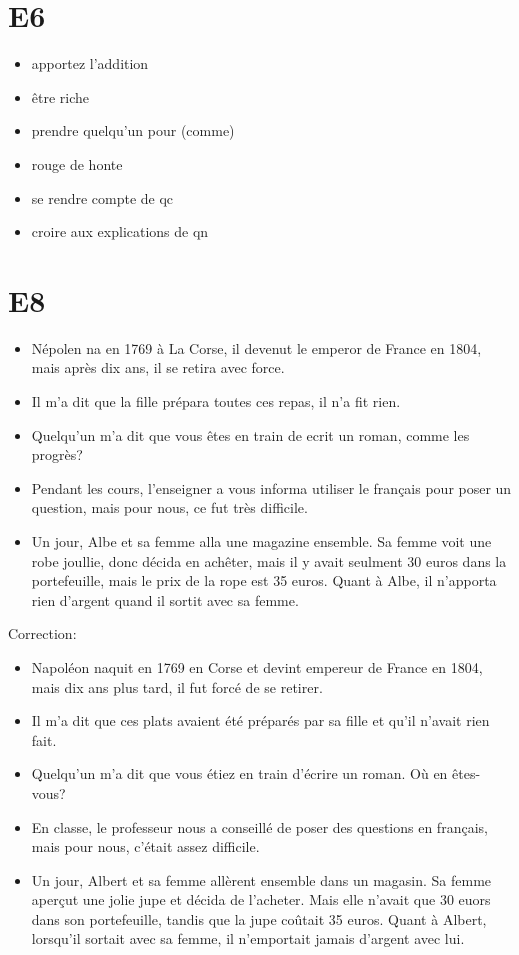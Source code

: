 \documentclass{book}
\begin{document}
    \section{E6}
        \begin{itemize}
            \item apportez l'addition
            \item être riche
            \item prendre quelqu'un pour (comme)
            \item rouge de honte
            \item se rendre compte de qc
            \item croire aux explications de qn
        \end{itemize}

    \section{E8}
        \begin{itemize}
            \item Népolen na en 1769 à La Corse, il devenut le emperor de France en 1804, 
                    mais après dix ans, il se retira avec force.
            \item Il m'a dit que la fille prépara toutes ces repas, il n'a fit rien.
            \item Quelqu'un m'a dit que vous êtes en train de ecrit un roman, comme les progrès?
            \item Pendant les cours, l'enseigner a vous informa utiliser le français pour poser un question, 
                    mais pour nous, ce fut très difficile.
            \item Un jour, Albe et sa femme alla une magazine ensemble. Sa femme voit une robe joullie,
                    donc décida en achêter, mais il y avait seulment 30 euros dans la portefeuille, mais le prix de la rope est 35 euros.
                    Quant à Albe, il n'apporta rien d'argent quand il sortit avec sa femme.
        \end{itemize}
        Correction:
        \begin{itemize}
            \item Napoléon naquit en 1769 en Corse et devint empereur de France en 1804, mais dix ans plus tard, il fut forcé de se retirer.
            \item Il m'a dit que ces plats avaient été préparés par sa fille et qu'il n'avait rien fait.
            \item Quelqu'un m'a dit que vous étiez en train d'écrire un roman. Où en êtes-vous?
            \item En classe, le professeur nous a conseillé de poser des questions en français, mais pour nous, c'était assez difficile.
            \item Un jour, Albert et sa femme allèrent ensemble dans un magasin. Sa femme aperçut une jolie jupe et décida de l'acheter.
                    Mais elle n'avait que 30 euors dans son portefeuille, tandis que la jupe coûtait 35 euros. 
                    Quant à Albert, lorsqu'il sortait avec sa femme, il n'emportait jamais d'argent avec lui.
        \end{itemize}
\end{document}

